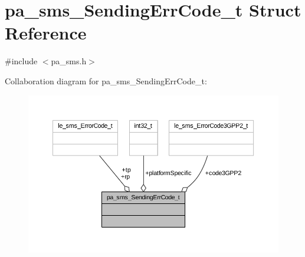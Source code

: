 \hypertarget{structpa__sms___sending_err_code__t}{}\section{pa\+\_\+sms\+\_\+\+Sending\+Err\+Code\+\_\+t Struct Reference}
\label{structpa__sms___sending_err_code__t}


{\ttfamily \#include $<$pa\+\_\+sms.\+h$>$}



Collaboration diagram for pa\+\_\+sms\+\_\+\+Sending\+Err\+Code\+\_\+t\+:
\nopagebreak
\begin{figure}[H]
\begin{center}
\leavevmode
\includegraphics[width=350pt]{structpa__sms___sending_err_code__t__coll__graph}
\end{center}
\end{figure}
